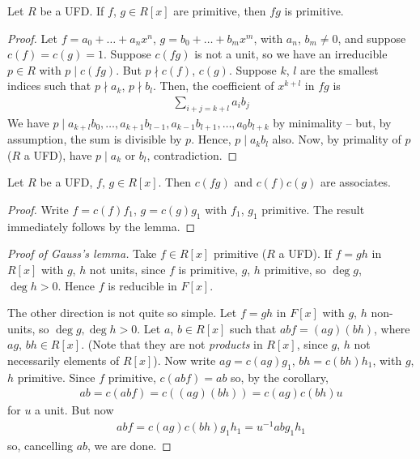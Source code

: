\documentclass{../template/note}
\begin{document}
    \begin{lemma}
        Let $R$ be a UFD. If $f$, $g \in R[x]$ are primitive, then $fg$ is primitive.
    \end{lemma}
    
    \begin{proof}
        Let $f = a_0 + \dots + a_nx^n$, $g = b_0 + \dots + b_mx^m$, with $a_n$, $b_m \neq 0$, and suppose $c(f) = c(g) = 1$. Suppose $c(fg)$ is not a unit, so we have an irreducible $p \in R$ with $p \mid c(fg)$. But $p \nmid c(f)$, $c(g)$. Suppose $k$, $l$ are the smallest indices such that $p \nmid a_k$, $p \nmid b_l$. Then, the coefficient of $x^{k+l}$ in $fg$ is
        \begin{align*}
            \sum_{i+j=k+l}a_ib_j
        \end{align*}
        We have $p \mid a_{k+l}b_0, \dots, a_{k+1}b_{l-1}, a_{k-1}b_{l+1}, \dots, a_0b_{l+k}$ by minimality -- but, by assumption, the sum is divisible by $p$. Hence, $p \mid a_kb_l$ also. Now, by primality of $p$ ($R$ a UFD), have $p \mid a_k$ or $b_l$, contradiction.        
    \end{proof}

    \begin{corollary}
        Let $R$ be a UFD, $f$, $g \in R[x]$. Then $c(fg)$ and $c(f)c(g)$ are associates.
    \end{corollary}
    
    \begin{proof}
        Write $f=c(f)f_1$, $g=c(g)g_1$ with $f_1$, $g_1$ primitive. The result immediately follows by the lemma.
    \end{proof}
    
    \begin{proof}[Proof of Gauss's lemma]
        Take $f \in R[x]$ primitive ($R$ a UFD). If $f = gh$ in $R[x]$ with $g$, $h$ not units, since $f$ is primitive, $g$, $h$ primitive, so $\deg g$, $\deg h > 0$. Hence $f$ is reducible in $F[x]$.

        The other direction is not quite so simple. Let $f=gh$ in $F[x]$ with $g$, $h$ non-units, so $\deg g, \deg h > 0$. Let $a$, $b \in R[x]$ such that $abf = (ag)(bh)$, where $ag$, $bh \in R[x]$. (Note that they are not \emph{products} in $R[x]$, since $g$, $h$ not necessarily elements of $R[x]$). Now write $ag = c(ag) g_1$, $bh = c(bh) h_1$, with $g$, $h$ primitive. Since $f$ primitive, $c(abf) = ab$ so, by the corollary,
        \begin{align*}
            ab = c(abf) = c((ag)(bh)) = c(ag)c(bh)u
        \end{align*}
        for $u$ a unit. But now
        \begin{align*}
            abf = c(ag)c(bh)g_1h_1 = u^{-1}abg_1h_1
        \end{align*}
        so, cancelling $ab$, we are done.
    \end{proof}
    
\end{document}
